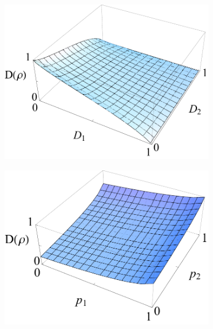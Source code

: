 \documentclass[%
 reprint,
 amsmath,amssymb,
 aps,
]{revtex4-1}
\begin{document}
\begin{figure}
        \centering
        \begin{subfigure}[b]{0.23\textwidth}
                \includegraphics[width=\textwidth]{sq2D}
                \caption{}
                \label{fig:A1}
        \end{subfigure}
        \begin{subfigure}[b]{0.23\textwidth}
                \includegraphics[width=\textwidth]{sq2W}
                \caption{}
                \label{fig:A2}
        \end{subfigure}
        \vfill
        \begin{subfigure}[b]{0.23\textwidth}

\end{subfigure}
\end{figure}
\end{document}
